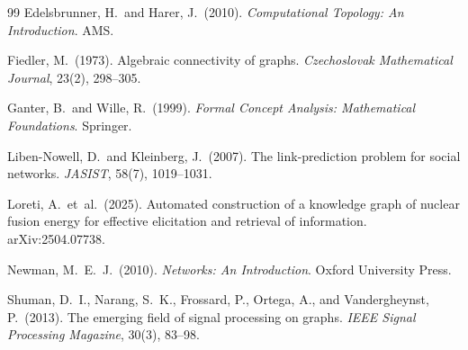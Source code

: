 \documentclass[11pt,a4paper]{article}
\begin{document}
\begin{thebibliography}{99}
Edelsbrunner, H.\ and Harer, J.\ (2010).
\newblock \emph{Computational Topology: An Introduction}.
\newblock AMS.

Fiedler, M.\ (1973).
\newblock Algebraic connectivity of graphs.
\newblock \emph{Czechoslovak Mathematical Journal}, 23(2), 298--305.

Ganter, B.\ and Wille, R.\ (1999).
\newblock \emph{Formal Concept Analysis: Mathematical Foundations}.
\newblock Springer.

Liben-Nowell, D.\ and Kleinberg, J.\ (2007).
\newblock The link-prediction problem for social networks.
\newblock \emph{JASIST}, 58(7), 1019--1031.

Loreti, A.\ et~al.\ (2025).
\newblock Automated construction of a knowledge graph of nuclear fusion energy for effective elicitation and retrieval of information.
\newblock arXiv:2504.07738.

Newman, M.~E.~J.\ (2010).
\newblock \emph{Networks: An Introduction}.
\newblock Oxford University Press.

Shuman, D.~I., Narang, S.~K., Frossard, P., Ortega, A., and Vandergheynst, P.\ (2013).
\newblock The emerging field of signal processing on graphs.
\newblock \emph{IEEE Signal Processing Magazine}, 30(3), 83--98.

\end{thebibliography}
\end{document}
